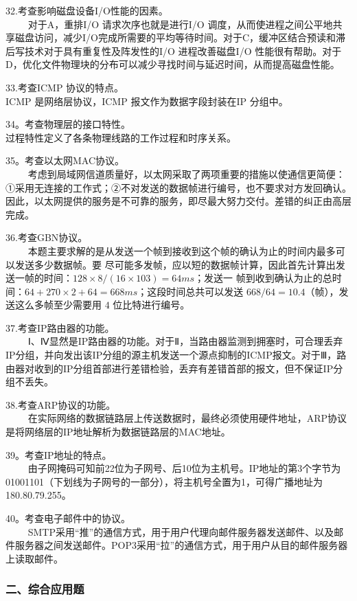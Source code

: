 32.考查影响磁盘设备I/O性能的因素。\\
$\qquad$ 对于A，重排I/O 请求次序也就是进行I/O 调度，从而使进程之间公平地共享磁盘访问，减少I/O完成所需要的平均等待时间。对于C，缓冲区结合预读和滞后写技术对于具有重复性及阵发性的I/O 进程改善磁盘I/O 性能很有帮助。对于D，优化文件物理块的分布可以减少寻找时间与延迟时间，从而提高磁盘性能。

33.考查ICMP 协议的特点。\\
ICMP 是网络层协议，ICMP 报文作为数据字段封装在IP 分组中。

34。考查物理层的接口特性。\\
过程特性定义了各条物理线路的工作过程和时序关系。

35。考查以太网MAC协议。\\
$\qquad$ 考虑到局域网信道质量好，以太网采取了两项重要的措施以使通信更简便：①采用无连接的工作式；②不对发送的数据帧进行编号，也不要求对方发回确认。因此，以太网提供的服务是不可靠的服务，即尽最大努力交付。差错的纠正由高层完成。

36.考查GBN协议。\\
$\qquad$ 本题主要求解的是从发送一个帧到接收到这个帧的确认为止的时间内最多可以发送多少数据帧。要
尽可能多发帧，应以短的数据帧计算，因此首先计算出发送一帧的时间：$128 \times 8/(16\times103)=64ms$；发送一
帧到收到确认为止的总时间：$64+270\times2+64=668ms$；这段时间总共可以发送 $668/64=10.4$（帧），发送这么多帧至少需要用 $4$ 位比特进行编号。

37.考查IP路由器的功能。\\
$\qquad$ Ⅰ、Ⅳ显然是IP路由器的功能。对于Ⅱ，当路由器监测到拥塞时，可合理丢弃IP分组，并向发出该IP分组的源主机发送一个源点抑制的ICMP报文。对于Ⅲ，路由器对收到的IP分组首部进行差错检验，丢弃有差错首部的报文，但不保证IP分组不丢失。

38.考查ARP协议的功能。\\
$\qquad$ 在实际网络的数据链路层上传送数据时，最终必须使用硬件地址，ARP协议是将网络层的IP地址解析为数据链路层的MAC地址。

39。考查IP地址的特点。\\
$\qquad$ 由子网掩码可知前22位为子网号、后10位为主机号。IP地址的第3个字节为01001101（下划线为子网号的一部分），将主机号全置为1，可得广播地址为180.80.79.255。

40。考查电子邮件中的协议。\\
$\qquad$ SMTP采用“推”的通信方式，用于用户代理向邮件服务器发送邮件、以及邮件服务器之间发送邮件。POP3采用“拉”的通信方式，用于用户从目的邮件服务器上读取邮件。

\subsubsection{二、综合应用题}

